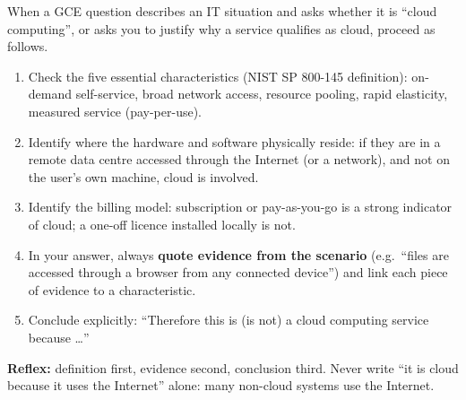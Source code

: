 \documentclass[11pt]{article}
\newcommand{\cle}[1]{{\popxbold\color{popdark}#1}}
\begin{document}
\begin{methode}
When a GCE question describes an IT situation and asks whether it is ``cloud computing'', or asks you to justify why a service qualifies as cloud, proceed as follows.
\begin{enumerate}
\item Check the \cle{five essential characteristics} (NIST SP 800-145 definition): \cle{on-demand self-service}, \cle{broad network access}, \cle{resource pooling}, \cle{rapid elasticity}, \cle{measured service} (pay-per-use).
\item Identify where the hardware and software physically reside: if they are in a \cle{remote data centre} accessed through the \cle{Internet} (or a network), and not on the user's own machine, cloud is involved.
\item Identify the billing model: subscription or pay-as-you-go is a strong indicator of cloud; a one-off licence installed locally is not.
\item In your answer, always \textbf{quote evidence from the scenario} (e.g.\ ``files are accessed through a browser from any connected device'') and link each piece of evidence to a characteristic.
\item Conclude explicitly: ``Therefore this is (is not) a cloud computing service because \ldots''
\end{enumerate}
\textbf{Reflex:} definition first, evidence second, conclusion third. Never write ``it is cloud because it uses the Internet'' alone: many non-cloud systems use the Internet.
\end{methode}
\end{document}
